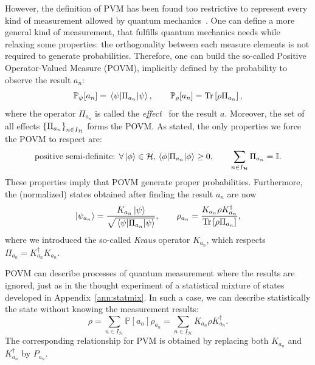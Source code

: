 However, the definition of PVM has been found too restrictive to represent every kind of measurement allowed by quantum mechanics~\cite{NielsenChuang,Bergou2021}. One can define a more general kind of measurement, that fulfills quantum mechanics needs while relaxing some properties: the orthogonality between each measure elements is not required to generate probabilities. Therefore, one can build the so-called Positive Operator-Valued Measure (POVM), implicitly defined by the probability to observe the result $a_n$:
\begin{equation}
    \mathbb{P}_\psi[a_n]= \expval{\Pi_{a_n}}{\psi},\qquad    \mathbb{P}_\rho[a_n]= \operatorname{Tr}\left[\rho \Pi_{a_n}\right],
\end{equation}
where the operator $\Pi_{a_n}$ is called the \textit{effect}~\cite{W96} for the result $a$. Moreover, the set of all effects $\qty{\Pi_{a_n}}_{n\in I_\mathcal{H}}$ forms the POVM\@. As stated, the only properties we force the POVM to respect are:
\begin{equation*}
    \text{positive semi-definite: }\forall\ket{\phi}\in\mathcal{H}, \expval{\Pi_{a_n}}{\phi}\geq 0,\qquad
    \sum_{n\in I_\mathcal{H}} \Pi_{a_n} = \mathbb{I}.
\end{equation*}
These properties imply that POVM generate proper probabilities. Furthermore, the (normalized) states obtained after finding the result $a_n$ are now
\begin{align}
    \ket{\psi_{a_n}} = \frac{K_{a_n}\ket{\psi}}{\sqrt{\expval{\Pi_{a_n}}{\psi}}},\qquad
    \rho_{a_n} = \frac{K_{a_n} \rho K_{a_n}^\dagger}{\operatorname{Tr}\left[\rho\Pi_{a_n}\right]},
\end{align}
where we introduced the so-called \textit{Kraus} operator $K_{a_n}$, which respects $\Pi_{a_n}=K_{a_n}^\dagger K_{a_n}$.

POVM can describe processes of quantum measurement where the results are ignored, just as in the thought experiment of a statistical mixture of states developed in Appendix~\ref{ann:statmix}. In such a case, we can describe statistically the state without knowing the measurement results:
\begin{equation}
    \rho = \sum_{n\in I_\mathcal{H}} \mathbb{P}[{a_n}]\rho_{a_n} = \sum_{n\in I_\mathcal{H}} K_{a_n} \rho K_{a_n}^\dagger.
\end{equation}
The corresponding relationship for PVM is obtained by replacing both $K_{a_n}$ and $K_{a_n}^\dagger$ by $P_{a_n}$. 

